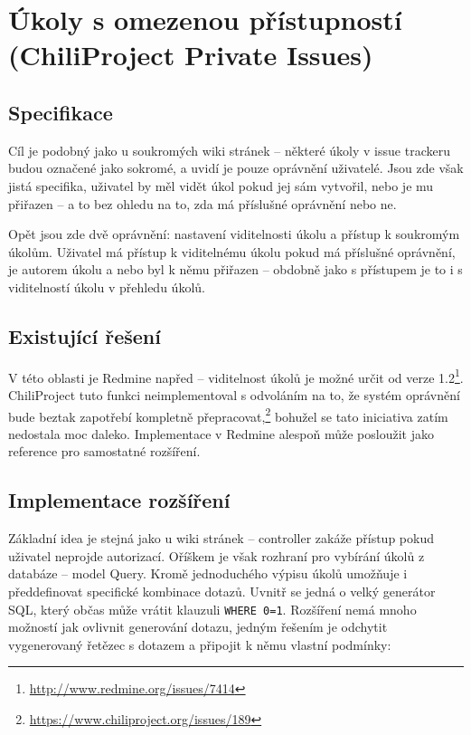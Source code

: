 \documentclass[thesis=B,czech]{FITthesis}[2012/05/02]
\begin{document}
\section{Úkoly s omezenou přístupností (ChiliProject Private Issues)}
\label{sec:private_issues}

\subsection{Specifikace}

Cíl je podobný jako u soukromých wiki stránek -- některé úkoly v issue
trackeru budou označené jako sokromé, a uvidí je pouze oprávnění
uživatelé. Jsou zde však jistá specifika, uživatel by měl vidět úkol
pokud jej sám vytvořil, nebo je mu přiřazen -- a to bez ohledu na to,
zda má příslušné oprávnění nebo ne.

Opět jsou zde dvě oprávnění: nastavení viditelnosti úkolu a přístup k
soukromým úkolům. Uživatel má přístup k viditelnému úkolu pokud má
příslušné oprávnění, je autorem úkolu a nebo byl k němu přiřazen --
obdobně jako s přístupem je to i s viditelností úkolu v přehledu úkolů.

\subsection{Existující řešení}

V této oblasti je Redmine napřed -- viditelnost úkolů je možné určit od
verze 1.2\footnote{\url{http://www.redmine.org/issues/7414}}.
ChiliProject tuto funkci neimplementoval s odvoláním na to, že systém
oprávnění bude beztak zapotřebí kompletně přepracovat,\footnote{\url{https://www.chiliproject.org/issues/189}}
bohužel se tato iniciativa zatím nedostala moc daleko. Implementace
v Redmine alespoň může posloužit jako reference pro samostatné
rozšíření.

\subsection{Implementace rozšíření}

Základní idea je stejná jako u wiki stránek -- controller zakáže přístup
pokud uživatel neprojde autorizací. Oříškem je však rozhraní pro
vybírání úkolů z databáze -- model Query. Kromě jednoduchého výpisu
úkolů umožňuje i předdefinovat specifické kombinace dotazů. Uvnitř se
jedná o velký generátor SQL, který občas může vrátit klauzuli
\lstinline!WHERE 0=1!. Rozšíření nemá mnoho možností jak ovlivnit
generování dotazu, jedným řešením je odchytit vygenerovaný řetězec s
dotazem a připojit k němu vlastní podmínky:
\end{document}
